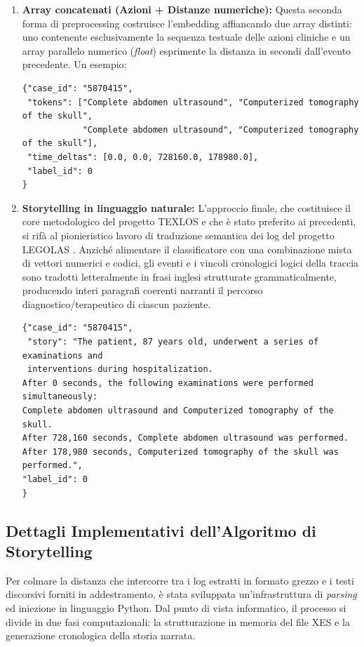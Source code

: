 \begin{enumerate}
    \item \textbf{Array concatenati (Azioni + Distanze numeriche):} Questa seconda forma di preprocessing costruisce l'embedding affiancando due array distinti: uno contenente esclusivamente la sequenza testuale delle azioni cliniche e un array parallelo numerico (\textit{float}) esprimente la distanza in secondi dall'evento precedente. Un esempio:
\begin{verbatim}
{"case_id": "5870415", 
 "tokens": ["Complete abdomen ultrasound", "Computerized tomography of the skull", 
            "Complete abdomen ultrasound", "Computerized tomography of the skull"], 
 "time_deltas": [0.0, 0.0, 728160.0, 178980.0], 
 "label_id": 0
}
\end{verbatim}

    \item \textbf{Storytelling in linguaggio naturale:} L'approccio finale, che costituisce il core metodologico del progetto TEXLOS \cite{texlos2026} e che è stato preferito ai precedenti, si rifà al pionieristico lavoro di traduzione semantica dei log del progetto LEGOLAS \cite{PASQUADIBISCEGLIE2025128224}. Anziché alimentare il classificatore con una combinazione mista di vettori numerici e codici, gli eventi e i vincoli cronologici logici della traccia sono tradotti letteralmente in frasi inglesi strutturate grammaticalmente, producendo interi paragrafi coerenti narranti il percorso diagnostico/terapeutico di ciascun paziente.
\begin{verbatim}
{"case_id": "5870415", 
 "story": "The patient, 87 years old, underwent a series of examinations and 
 interventions during hospitalization.
After 0 seconds, the following examinations were performed simultaneously: 
Complete abdomen ultrasound and Computerized tomography of the skull.
After 728,160 seconds, Complete abdomen ultrasound was performed.
After 178,980 seconds, Computerized tomography of the skull was performed.",
"label_id": 0
}
\end{verbatim}
\end{enumerate}

\subsection{Dettagli Implementativi dell'Algoritmo di Storytelling}
Per colmare la distanza che intercorre tra i log estratti in formato grezzo e i testi discorsivi forniti in addestramento, è stata sviluppata un'infrastruttura di \textit{parsing} ed iniezione in linguaggio Python. Dal punto di vista informatico, il processo si divide in due fasi computazionali: la strutturazione in memoria del file XES e la generazione cronologica della storia narrata. 

